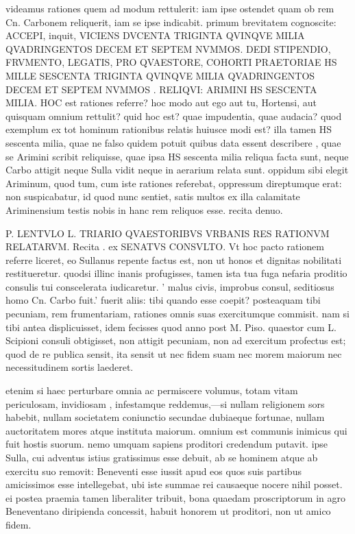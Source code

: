  videamus rationes quem ad modum rettulerit: iam ipse ostendet quam ob rem Cn. Carbonem reliquerit, iam se ipse indicabit. primum brevitatem cognoscite: ACCEPI, inquit, VICIENS DVCENTA TRIGINTA QVINQVE MILIA QVADRINGENTOS DECEM ET SEPTEM NVMMOS. DEDI STIPENDIO, FRVMENTO, LEGATIS, PRO QVAESTORE, COHORTI PRAETORIAE HS MILLE SESCENTA TRIGINTA QVINQVE MILIA QVADRINGENTOS DECEM ET SEPTEM NVMMOS . RELIQVI: ARIMINI HS SESCENTA MILIA. HOC est rationes referre? hoc modo aut ego aut tu, Hortensi, aut quisquam omnium rettulit? quid hoc est? quae impudentia, quae audacia? quod exemplum ex tot hominum rationibus relatis huiusce modi est? illa tamen HS sescenta milia, quae ne falso quidem potuit quibus data essent describere , quae se Arimini scribit reliquisse, quae ipsa HS sescenta milia reliqua facta sunt, neque Carbo attigit neque Sulla vidit neque in aerarium relata sunt. oppidum sibi elegit Ariminum, quod tum, cum iste rationes referebat, oppressum direptumque erat: non suspicabatur, id quod nunc sentiet, satis multos ex illa calamitate Ariminensium testis nobis in hanc rem reliquos esse. recita denuo.

 P. LENTVLO L. TRIARIO QVAESTORIBVS VRBANIS RES RATIONVM RELATARVM. Recita . ex SENATVS CONSVLTO. Vt hoc pacto rationem referre liceret, eo Sullanus repente factus est, non ut honos et dignitas nobilitati restitueretur. quodsi illinc inanis profugisses, tamen ista tua fuga nefaria proditio consulis tui conscelerata iudicaretur. ' malus civis, improbus consul, seditiosus homo Cn. Carbo fuit.' fuerit aliis: tibi quando esse coepit? posteaquam tibi pecuniam, rem frumentariam, rationes omnis suas exercitumque commisit. nam si tibi antea displicuisset, idem fecisses quod anno post M. Piso. quaestor cum L. Scipioni consuli obtigisset, non attigit pecuniam, non ad exercitum profectus est; quod de re publica sensit, ita sensit ut nec fidem suam nec morem maiorum nec necessitudinem sortis laederet.

 etenim si haec perturbare omnia ac permiscere volumus, totam vitam periculosam, invidiosam , infestamque reddemus,—si nullam religionem sors habebit, nullam societatem coniunctio secundae dubiaeque fortunae, nullam auctoritatem mores atque instituta maiorum. omnium est communis inimicus qui fuit hostis suorum. nemo umquam sapiens proditori credendum putavit. ipse Sulla, cui adventus istius gratissimus esse debuit, ab se hominem atque ab exercitu suo removit: Beneventi esse iussit apud eos quos suis partibus amicissimos esse intellegebat, ubi iste summae rei causaeque nocere nihil posset. ei postea praemia tamen liberaliter tribuit, bona quaedam proscriptorum in agro Beneventano diripienda concessit, habuit honorem ut proditori, non ut amico fidem.

